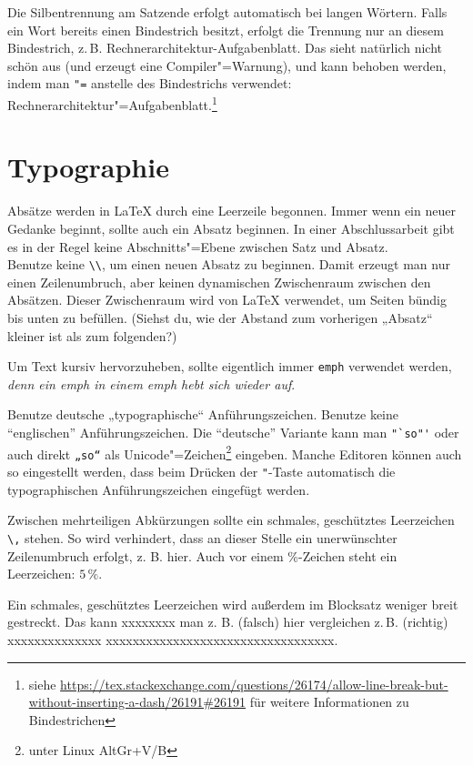 Die Silbentrennung am Satzende erfolgt automatisch bei langen Wörtern.
Falls ein Wort bereits einen Bindestrich besitzt, erfolgt die Trennung nur an diesem Bindestrich, z.\,B. Rechnerarchitektur-Aufgabenblatt.
Das sieht natürlich nicht schön aus (und erzeugt eine Compiler"=Warnung), und kann behoben werden, indem man \verb|"=| anstelle des Bindestrichs verwendet: Rechnerarchitektur"=Aufgabenblatt.\footnote{siehe \url{https://tex.stackexchange.com/questions/26174/allow-line-break-but-without-inserting-a-dash/26191\#26191} für weitere Informationen zu Bindestrichen}

\section{Typographie}

Absätze werden in \LaTeX{} durch eine Leerzeile begonnen.
Immer wenn ein neuer Gedanke beginnt, sollte auch ein Absatz beginnen.
In einer Abschlussarbeit gibt es in der Regel keine Abschnitts"=Ebene zwischen Satz und Absatz.\\
Benutze keine \verb|\\|, um einen neuen Absatz zu beginnen.
Damit erzeugt man nur einen Zeilenumbruch, aber keinen dynamischen Zwischenraum zwischen den Absätzen.
Dieser Zwischenraum wird von \LaTeX{} verwendet, um Seiten bündig bis unten zu befüllen.
(Siehst du, wie der Abstand zum vorherigen „Absatz“ kleiner ist als zum folgenden?)

Um Text kursiv hervorzuheben, sollte eigentlich immer \verb|emph| verwendet werden, \emph{denn ein emph \emph{in einem emph} hebt sich wieder auf}.

Benutze deutsche „typographische“ Anführungszeichen.
Benutze keine ``englischen'' Anführungszeichen.
Die "`deutsche"' Variante kann man \verb|"`so"'| oder auch direkt \verb|„so“| als Unicode"=Zeichen\footnote{unter Linux AltGr+V/B} eingeben.
Manche Editoren können auch so eingestellt werden, dass beim Drücken der \verb|"|-Taste automatisch die typographischen Anführungszeichen eingefügt werden.

Zwischen mehrteiligen Abkürzungen sollte ein schmales, geschütztes Leerzeichen \verb|\,| stehen. So wird verhindert, dass an dieser Stelle ein unerwünschter Zeilenumbruch erfolgt, z. B. hier.
Auch vor einem \%-Zeichen steht ein Leerzeichen: $5\,\%$.

Ein schmales, geschütztes Leerzeichen wird außerdem im Blocksatz weniger breit gestreckt. Das kann xxxxxxxx man z. B. (falsch) hier vergleichen z.\,B. (richtig) xxxxxxxxxxxxxx xxxxxxxxxxxxxxxxxxxxxxxxxxxxxxxxxx.

